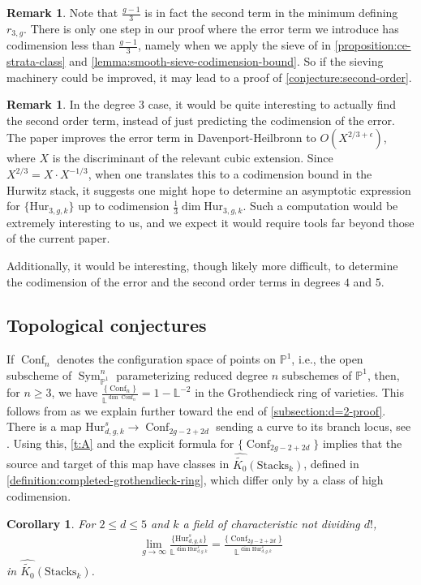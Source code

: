 \documentclass[12 pt]{amsart}
\theoremstyle{plain}
\newtheorem{corollary}[theorem]{Corollary}
\theoremstyle{definition}
\newtheorem{remark}[theorem]{Remark}
\theoremstyle{remark}
\numberwithin{equation}{section}
\newcommand\bl{\mathbb L}
\newcommand\bp{\mathbb P}
\newcommand\hur[3]{\mathrm{Hur}_{#1,#2,#3}} %
\newcommand\rhur[4]{\mathrm{Hur}_{#1,#2,#3}^{#4}} %
\newcommand\codimbound[2]{r_{#1,#2}} %
\newcommand\grcSpaces{\widehat{\widetilde{K_0}}(\mathrm{Spaces}_k)} %
\newcommand\grcStacks{\widehat{\widetilde{K_0}}(\mathrm{Stacks}_k)} %
\DeclareMathOperator\conf{Conf}
\DeclareMathOperator\sym{Sym}
\begin{document}
\begin{remark}
	\label{remark:}
	Note that $\frac{g-1}{3}$ is in fact the second term in the minimum
defining $\codimbound 3 g$. 
There is only one step in our proof where the error term we introduce has
codimension less than $\frac{g-1}{3}$, namely when we apply the sieve of
\cite{biluH:motivic-euler-products-in-motivic-statistics} in
\autoref{proposition:ce-strata-class} and
\autoref{lemma:smooth-sieve-codimension-bound}.
So if the sieving machinery could be improved, it may lead to a proof of
\autoref{conjecture:second-order}.
\end{remark}

\begin{remark}
	\label{remark:}
	In the degree $3$ case, it would be quite interesting to actually find the
second order term, instead of just predicting the codimension of the error.
The paper 
\cite{bhargavaTT:improved-error}
improves the error term in Davenport-Heilbronn to $O(X^{2/3+\epsilon})$,
where $X$ is the discriminant of the relevant cubic extension.
Since $X^{2/3} = X \cdot X^{-1/3}$, when one translates this to a codimension
bound in the Hurwitz stack, it suggests 
one might hope to determine an 
asymptotic expression for
$\{\hur 3 g k\}$
up to codimension $\frac{1}{3} \dim \hur 3 g k$.
Such a computation would be extremely interesting to us, and we expect it would 
require tools far beyond those of the current paper.

Additionally, it would be interesting, though likely more difficult, to determine the codimension of the error
and the second order terms in degrees $4$ and $5$.
\end{remark}

\subsection{Topological conjectures}
If $\conf_n$ denotes the configuration space of
points on $\bp^1$, i.e., the open subscheme of $\sym^n_{\bp^1}$ parameterizing
reduced degree $n$ subschemes of $\bp^1$,
then, for $n\geq 3$, we have $\frac{\{\conf_n\}}{\bl^{\dim \conf_n}} = 1 - \bl^{-2}$ 
in the Grothendieck ring of varieties.
This follows from \cite[Lem.\ 5.9(a)]{Vakil2015} as we explain further toward
the end of \autoref{subsection:d=2-proof}.
There is a map $\rhur d g k s \to \conf_{2g-2 + 2d}$ sending a curve to its
branch locus, 
see \cite{fantechiP:stable-maps-and-branch-divisors}.
Using this, \autoref{t:A} and the explicit formula for
$\{\conf_{2g-2 + 2d}\}$
implies that the source and target of
this map have classes in $\grcStacks$,
defined in
\autoref{definition:completed-grothendieck-ring},
which differ only by a class of high
codimension.
\begin{corollary}
	\label{corollary:}
	For $2 \leq d \leq 5$ and $k$ a field of characteristic not dividing
	$d!$,
	\begin{align*}
		\lim_{g \to \infty} \frac{\{\rhur d g k s \}}{\bl^{\dim \rhur d
		g k s}} 
		=\frac{ \{ \conf_{2g-2 + 2d}\}}{\bl^{\dim \rhur d g k s}}
	\end{align*}
	in $\grcStacks$. 
\end{corollary}
\end{document}
